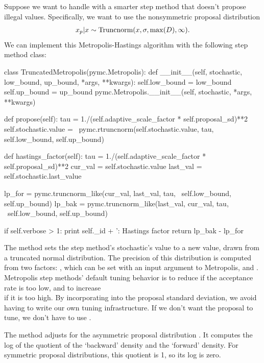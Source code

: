 \documentclass[]{jss}
\begin{document}
\medskip
Suppose we want to handle  with a smarter step method that doesn't propose illegal values. Specifically, we want to use the nonsymmetric proposal distribution
\begin{eqnarray*}
  x_p | x \sim \textup{Truncnorm}(x, \sigma, \max(D), \infty).
\end{eqnarray*}
We can implement this Metropolis-Hastings algorithm with the following step method class:
\begin{CodeInput}
class TruncatedMetropolis(pymc.Metropolis):
	def __init__(self, stochastic, low_bound, up_bound, *args, **kwargs):
	    self.low_bound = low_bound
	    self.up_bound = up_bound
	    pymc.Metropolis.__init__(self, stochastic, *args, **kwargs)

	def propose(self):
	    tau = 1./(self.adaptive_scale_factor * self.proposal_sd)**2
	    self.stochastic.value = \
	        pymc.rtruncnorm(self.stochastic.value, tau, self.low_bound, self.up_bound)

	def hastings_factor(self):
	    tau = 1./(self.adaptive_scale_factor * self.proposal_sd)**2
	    cur_val = self.stochastic.value
	    last_val = self.stochastic.last_value

	    lp_for = pymc.truncnorm_like(cur_val, last_val, tau, \
	        self.low_bound, self.up_bound)
	    lp_bak = pymc.truncnorm_like(last_val, cur_val, tau, \
	        self.low_bound, self.up_bound)

	    if self.verbose > 1:
	        print self._id + ': Hastings factor %
	    return lp_bak - lp_for
\end{CodeInput}

The  method sets the step method's stochastic's value to a new value, drawn from a truncated normal distribution. The precision of this distribution is computed from two factors: , which can be set with an input argument to Metropolis, and . Metropolis step methods' default tuning behavior is to reduce  if the acceptance rate is too low, and to increase \\ if it is too high. By incorporating  into the proposal standard deviation, we avoid having to write our own tuning infrastructure. If we don't want the proposal to tune, we don't have to use .

The  method adjusts for the asymmetric proposal distribution \citep{gelman}. It computes the log of the quotient of the `backward' density and the `forward' density. For symmetric proposal distributions, this quotient is 1, so its log is zero. 
\end{document}
